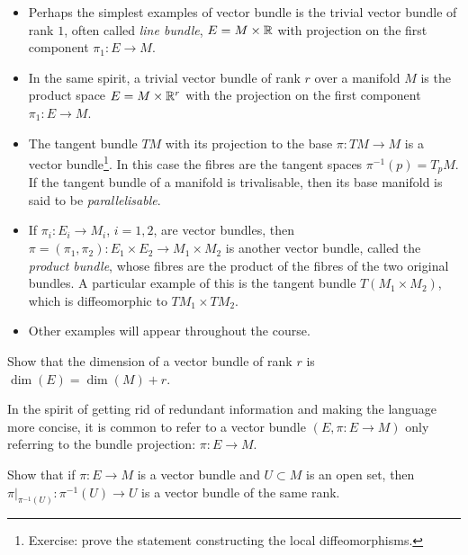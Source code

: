 \begin{example}\label{ex:simple_bundles}
  \begin{itemize}
    \item Perhaps the simplest examples of vector bundle is the trivial vector bundle of rank $1$, often called \emph{line bundle}, $E = M \times \mathbb{R}$ with projection on the first component $\pi_1: E \to M$.
    \item In the same spirit, a trivial vector bundle of rank $r$ over a manifold $M$ is the product space $E = M\times \mathbb{R}^r$ with the projection on the first component $\pi_1: E\to M$.
    \item The tangent bundle $TM$ with its projection to the base $\pi:TM\to M$ is a vector bundle\footnote{Exercise: prove the statement constructing the local diffeomorphisms.}.
          In this case the fibres are the tangent spaces $\pi^{-1}(p) = T_pM$.
          If the tangent bundle of a manifold is trivalisable, then its base manifold is said to be \emph{parallelisable}.
    \item If $\pi_i: E_i\to M_i$, $i=1,2$, are vector bundles, then $\pi = (\pi_1, \pi_2): E_1\times E_2 \to M_1\times M_2$ is another vector bundle, called the \emph{product bundle}, whose fibres are the product of the fibres of the two original bundles.
          A particular example of this is the tangent bundle $T(M_1\times M_2)$, which is diffeomorphic to $TM_1 \times TM_2$.
    \item Other examples will appear throughout the course.
  \end{itemize}
\end{example}

\begin{exercise}
  Show that the dimension of a vector bundle of rank $r$ is $\dim(E) = \dim(M) + r$.
\end{exercise}

\begin{remark}
  In the spirit of getting rid of redundant information and making the language more concise, it is common to refer to a vector bundle $(E, \pi : E \to M)$ only referring to the bundle projection: $\pi : E \to M$.
\end{remark}

\begin{exercise}
  Show that if $\pi:E\to M$ is a vector bundle and $U\subset M$ is an open set, then $\pi\big|_{\pi^{-1}(U)}: \pi^{-1}(U) \to U$ is a vector bundle of the same rank.
\end{exercise}

